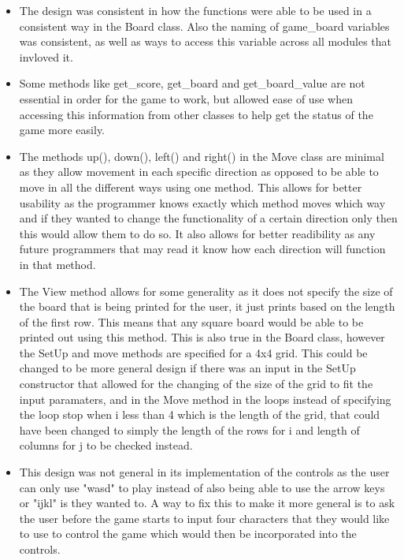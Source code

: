 \documentclass[12pt]{article}
\begin{document}
\begin{itemize}

\item The design was consistent in how the functions were able to be used in a consistent way in the Board class. Also the
naming of game\_board variables was consistent, as well as ways to access this variable across all modules that invloved it.

\item Some methods like get\_score, get\_board and get\_board\_value are not essential in order for the game to work, but allowed ease of use when accessing this information from other classes to help get the status of the game more easily. 

\item The methods up(), down(), left() and right() in the Move class are minimal as they allow movement in each specific direction as opposed to be able to move in all the different ways using one method. This allows for better usability as the programmer knows exactly which method moves which way and if they wanted to change the functionality of a certain direction only then this would allow them to do so. It also allows for better readibility as any future programmers that may read it know how each direction will function in that method. 

\item The View method allows for some generality as it does not specify the size of the board that is being printed for the user, it just prints based on the length of the first row. This means that any square board would be able to be printed out using this method. This is also true in the Board class, however the SetUp and move methods are specified for a 4x4 grid. This could be changed to be more general design if there was an input in the SetUp constructor that allowed for the changing of the size of the grid to fit the input paramaters, and in the Move method in the loops instead of specifying the loop stop when i less than 4 which is the length of the grid, that could have been changed to simply the length of the rows for i and length of columns for j to be checked instead. 

\item This design was not general in its implementation of the controls as the user can only use "wasd" to play instead of also being able to use the arrow keys or "ijkl" is they wanted to. A way to fix this to make it more general is to ask the user before the game starts to input four characters that they would like to use to control the game which would then be incorporated into the controls. 


\end{itemize}
\end{document}
